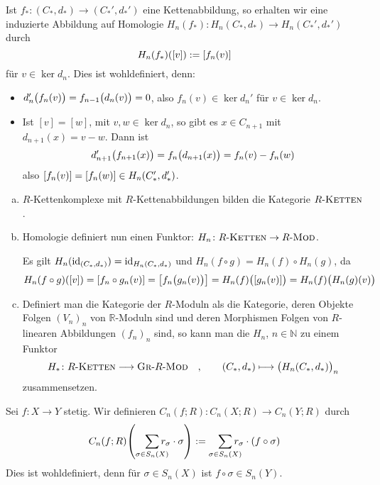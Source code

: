 \begin{bemerkung}[{name=[{Induzierte Abbildung einer Kettenabbildung auf Homologie}]}]
	Ist $f_* \colon (C_*,d_*) \to (C_*',d_*')$ eine Kettenabbildung, so erhalten wir eine induzierte Abbildung auf Homologie $H_n(f_*) \colon H_n(C_*,d_*) \to H_n(C_*',d_*')$ durch
	\[
		H_n(f_*) \enbrace*{[v]} := \benbrace*{f_n(v)}  
	\]
	für $v \in \ker d_n$. Dies ist wohldefiniert, denn:
	\begin{itemize}
		\item $d_n' \enbrace[\big]{f_n(v)} = f_{n-1} \enbrace[\big]{d_n(v)} = 0 $, also $f_n(v) \in \ker d_n'$ für $v \in \ker d_n$.
		\item Ist $[v]=[w]$, mit $v,w \in\ker d_n$, so gibt es $x \in C_{n+1}$ mit $d_{n+1}(x)=v-w$. Dann ist 
		\[
			d_{n+1}'\enbrace[\big]{f_{n+1}(x)} = f_n \enbrace[\big]{d_{n+1}(x)} = f_n(v)- f_n(w) 
		\]
		also $\benbrace*{f_n(v)} = \benbrace*{f_n(w)} \in H_n(C_*',d_*')$.
	\end{itemize}
\end{bemerkung}

\begin{bemerkung}[{name=[Homologie definiert einen Funktor]},label=bem:63]
	\leavevmode
	\begin{enumerate}[a)]
		\item $R$-Kettenkomplexe mit $R$-Kettenabbildungen bilden die Kategorie $R\text{-}\textsc{Ketten}$.
		\item Homologie definiert nun einen Funktor: $H_n \colon R\text{-}\textsc{Ketten} \to R\text{-}\MOD$.
	
		Es gilt $H_n(\id_{(C_*,d_*)}) = \id_{H_n(C_*,d_*)}$ und $H_n(f \circ g) = H_n(f) \circ H_n(g)$, da
		\[
			H_n(f \circ g) \enbrace*{[v]} = \benbrace*{f_n \circ g_n(v)} = \benbrace*{f_n \enbrace[\big]{g_n(v)} } = H_n(f) \enbrace[\big]{\benbrace*{g_n(v)}} = H_n(f) \enbrace[\big]{H_n(g)(v)}     
		\]
		\item Definiert man die Kategorie der  $R$-Moduln als die Kategorie, deren Objekte Folgen $(V_n)_n$ von $\mathbb{R}$-Moduln sind und deren
		Morphismen Folgen von $R$-linearen Abbildungen $(f_n)_{n}$ sind, so kann man die $H_n$, $n \in \mathbb{N}$ zu einem Funktor
		\[
			H_* \colon R\text{-}\textsc{Ketten} \longrightarrow \textsc{Gr}\text{-}R\text{-}\MOD \quad , \qquad (C_*,d_*) \longmapsto \enbrace[\big]{H_n(C_*,d_*)}_n 
		\]
		zusammensetzen.
	\end{enumerate}
\end{bemerkung}

\begin{definition}[{name=[Induzierte Abbildung auf Kettenkomplexen]}]
	Sei $f \colon X \to Y$ stetig. Wir definieren $C_n(f;R) \colon C_n(X;R) \to C_n(Y;R)$ durch
	\[
		C_n(f;R) \enbrace*{\smashoperator[r]{\sum_{\sigma \in S_n(X)}} r_\sigma \cdot  \sigma} := \smashoperator[r]{\sum_{\sigma \in S_n(X)}} r_\sigma \cdot \enbrace*{f \circ \sigma} 
	\]
	Dies ist wohldefiniert, denn für $\sigma \in S_n(X)$ ist $f \circ \sigma \in S_n(Y)$.
\end{definition}

